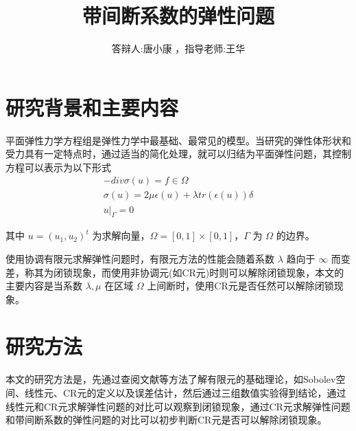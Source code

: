 \documentclass[UTF8]{ctexbeamer} %
\title{带间断系数的弹性问题} %
\author[唐小康]{答辩人:唐小康 ，指导老师:王华}
\begin{document}
\begin{frame}
	\titlepage
\end{frame}

\begin{frame}
	\tableofcontents
\end{frame}

\section{研究背景和主要内容}
\begin{frame}
	平面弹性力学方程组是弹性力学中最基础、最常见的模型。当研究的弹性体形状和受力具有一定特点时，通过适当的简化处理，就可以归结为平面弹性问题，其控制方程可以表示为以下形式
	$$
	\begin{matrix}
		-div \sigma (u) = f \in \Omega \\
		\sigma(u) = 2 \mu \epsilon(u) + \lambda tr(\epsilon(u)) \delta \\
		u |_{\Gamma} = 0
	\end{matrix}
	$$
	
	其中 $u=(u_1,u_2)^t$ 为求解向量，$\Omega = [0,1] \times [0,1]$，$\Gamma$ 为 $\Omega$ 的边界。 
\end{frame}

\begin{frame}
	使用协调有限元求解弹性问题时，有限元方法的性能会随着系数 $\lambda$ 趋向于 $\infty$ 而变差，称其为闭锁现象，而使用非协调元(如CR元)时则可以解除闭锁现象，本文的主要内容是当系数 $\lambda, \mu$ 在区域 $\Omega$ 上间断时，使用CR元是否任然可以解除闭锁现象。
\end{frame}

\section{研究方法}
\begin{frame}
	本文的研究方法是，先通过查阅文献等方法了解有限元的基础理论，如Sobolev空间、线性元、CR元的定义以及误差估计，然后通过三组数值实验得到结论，通过线性元和CR元求解弹性问题的对比可以观察到闭锁现象，通过CR元求解弹性问题和带间断系数的弹性问题的对比可以初步判断CR元是否可以解除闭锁现象。
\end{frame}
\end{document}
